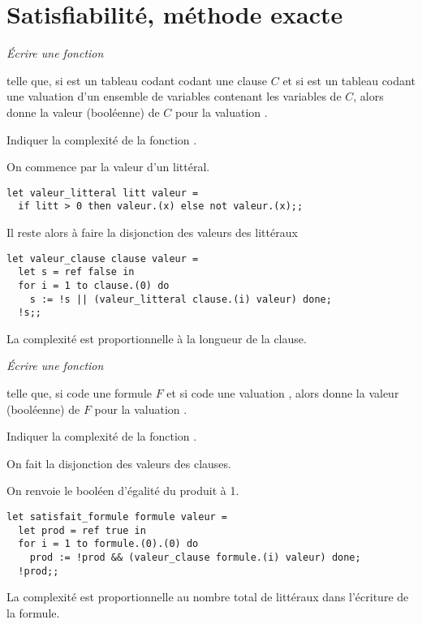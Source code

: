 \section{Satisfiabilité, méthode exacte}
\begin{Exercise}\it
Écrire une fonction 

telle que, si  est un tableau codant codant une clause $C$ et si  est un tableau codant une valuation \val d’un ensemble de variables contenant les variables de $C$, alors  donne la valeur (booléenne) de $C$ pour la valuation \val.

Indiquer la complexité de la fonction .
\end{Exercise}
\begin{Answer}On commence par la valeur d'un littéral.
\begin{lstlisting}
let valeur_litteral litt valeur =
  if litt > 0 then valeur.(x) else not valeur.(x);;
\end{lstlisting}
Il reste alors à faire la disjonction des valeurs des littéraux
\begin{lstlisting}
let valeur_clause clause valeur =
  let s = ref false in
  for i = 1 to clause.(0) do
    s := !s || (valeur_litteral clause.(i) valeur) done;
  !s;;
\end{lstlisting}
La complexité est proportionnelle à la longueur de la clause.
\end{Answer}
\begin{Exercise}\it
Écrire une fonction 

telle que, si  code une formule $F$ et si  code une valuation \val,  alors  donne la valeur (booléenne) de $F$ pour la valuation \val.

Indiquer la complexité de la fonction .
\end{Exercise}
\begin{Answer}On fait la disjonction des valeurs des clauses. 

On renvoie le booléen d'égalité du produit à 1.
\begin{lstlisting}
let satisfait_formule formule valeur =
  let prod = ref true in
  for i = 1 to formule.(0).(0) do
    prod := !prod && (valeur_clause formule.(i) valeur) done;
  !prod;;
\end{lstlisting}
La complexité est proportionnelle au nombre total de littéraux dans l'écriture de la formule.
\end{Answer}
\medskip

